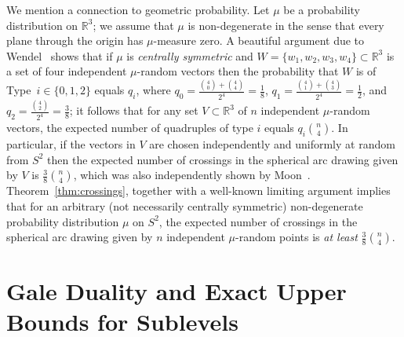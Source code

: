 \documentclass[a4paper,USenglish,cleveref, autoref, thm-restate,nolineno]{socg-lipics-v2021}
\newcommand{\R}{\mathbb{R}}
\begin{document}
\begin{remark} 
\label{rem:Wendel}
We mention a connection to geometric probability. Let $\mu$ be a probability distribution on $\R^3$; we assume that $\mu$ is non-degenerate  in the sense that every plane through the origin has $\mu$-measure zero. A beautiful argument due to Wendel~\cite{Wendel:1962aa} shows that if $\mu$ is \emph{centrally symmetric} and $W=\{w_1,w_2,w_3,w_4\} \subset \R^3$ is a set of four independent $\mu$-random vectors then the probability that $W$ is of Type~$i \in \{0,1,2\}$ equals $q_i$, where  $q_0=\frac{\binom{4}{0}+\binom{4}{4}}{2^4}=\frac{1}{8}$, $q_1=\frac{\binom{4}{1}+\binom{4}{3}}{2^4}=\frac{1}{2}$, and $q_2=\frac{\binom{4}{2}}{2^4}=\frac{3}{8}$;
 it follows that for any set $V\subset \R^3$ of $n$ independent $\mu$-random vectors, the expected number of quadruples of type $i$ equals $q_i \binom{n}{4}$.
 In particular, if the vectors in $V$ are chosen independently and uniformly at random from $S^2$ then the expected number of crossings in the spherical arc drawing given by $V$ is $\frac{3}{8}\binom{n}{4}$, which was also independently shown by Moon~\cite{Moon:1965aa}. Theorem~\ref{thm:crossings}, together with a well-known limiting argument \cite{Scheinerman:1994aa} implies that for an arbitrary (not necessarily centrally symmetric) non-degenerate probability distribution $\mu$ on $S^2$, the expected number of crossings in the spherical arc drawing given by $n$ independent 
 $\mu$-random points is \emph{at least} $\frac{3}{8}\binom{n}{4}$. 
\end{remark}


\section{Gale Duality and Exact Upper Bounds for Sublevels}
\label{sec:Gale}
\end{document}
